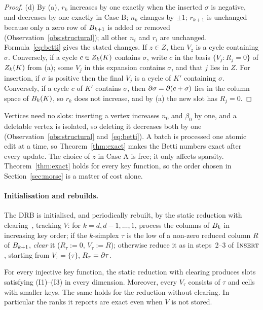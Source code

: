 \begin{proof}
(d) By (a), $r_k$ increases by one exactly when the inserted $\sigma$ is negative,
and decreases by one exactly in Case B; $n_k$ changes by $\pm1$; $r_{k+1}$ is
unchanged because only a zero row of $B_{k+1}$ is added or removed
(Observation~\ref{obs:structural}); all other $n_i$ and $r_i$ are unchanged.
Formula~\eqref{eq:betti} gives the stated changes. If
$z\in Z$, then $V_z$ is a cycle containing $\sigma$. Conversely, if a cycle
$c\in Z_{k}(K)$ contains $\sigma$, write $c$ in the basis
$\{V_j:R_j=0\}$ of $Z_{k}(K)$ from (a); some $V_j$ in this expansion contains
$\sigma$, and that $j$ lies in $Z$. For insertion, if $\sigma$ is positive then
the final $V_j$ is a cycle of $K'$ containing $\sigma$. Conversely, if a cycle
$c$ of $K'$ contains $\sigma$, then $\partial\sigma=\partial(c+\sigma)$ lies in the
column space of $B_{k}(K)$, so $r_k$ does not increase, and by (a) the new slot
has $R_j=0$.
\end{proof}

Vertices need no slots: inserting a vertex increases $n_0$ and $\beta_0$ by
one, and a deletable vertex is isolated, so deleting it decreases both by one
(Observation~\ref{obs:structural} and~\eqref{eq:betti}). A batch is processed
one atomic edit at a time, so Theorem~\ref{thm:exact} makes the Betti numbers
exact after every update. The choice of $z$ in Case A
is free; it only affects sparsity. Theorem~\ref{thm:exact} holds for every key
function, so the order chosen in Section~\ref{sec:morse} is a matter of cost
alone.

\paragraph{Initialisation and rebuilds.}
The DRB is initialised, and periodically rebuilt, by the static reduction with
clearing~\cite{chen2011twist}, tracking $V$: for $k=d,d-1,\dots,1$, process the
columns of $B_{k}$ in increasing key order; if the $k$-simplex $\tau$ is the low
of a non-zero reduced column $R$ of $B_{k+1}$, \emph{clear} it ($R_\tau:=0$,
$V_\tau:=R$); otherwise reduce it as in steps~2--3 of $\textup{\textsc{Insert}}$, starting from
$V_\tau=\{\tau\}$, $R_\tau=\partial\tau$.

\begin{subproposition}[Rebuild]\label{cor:rebuild}
For every injective key function, the static reduction with clearing produces
slots satisfying (I1)--(I3) in every dimension. Moreover, every $V_\tau$ consists
of $\tau$ and cells with smaller keys. The same holds for the reduction without
clearing. In particular the ranks it reports are exact even when $V$ is not
stored.
\end{subproposition}


